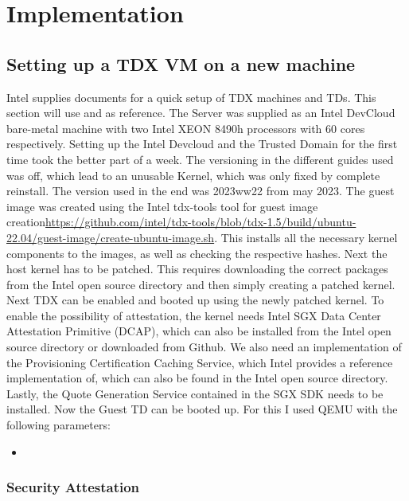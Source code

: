 
\chapter{Implementation}

\section{Setting up a TDX VM on a new machine}
\label{ch:SettingUpTDX}
Intel supplies documents for a quick setup of TDX machines and TDs. This section will use \cite{GettingStartedIntel} and \cite{IntelSubstackForLinux} as reference. The Server was supplied as an Intel DevCloud bare-metal machine with two Intel XEON 8490h processors with 60 cores respectively. Setting up the Intel Devcloud and the Trusted Domain for the first time took the better part of a week. The versioning in the different guides used \cite{gettingStarted} \cite{TDXWhitepaperFebruary2022Pdf} was off, which lead to an unusable Kernel, which was only fixed by complete reinstall. The version used in the end was 2023ww22 from may 2023. The guest image was created using the Intel tdx-tools tool for guest image creation\url{https://github.com/intel/tdx-tools/blob/tdx-1.5/build/ubuntu-22.04/guest-image/create-ubuntu-image.sh}.
This installs all the necessary kernel components to the images, as well as checking the respective hashes. Next the host kernel has to be patched. This requires downloading the correct packages from the Intel open source directory and then simply creating a patched kernel. Next TDX can be enabled and booted up using the newly patched kernel. To enable the possibility of attestation, the kernel needs Intel SGX Data Center Attestation Primitive (DCAP), which can also be installed from the Intel open source directory or downloaded from Github. We also need an implementation of the Provisioning Certification Caching Service, which Intel provides a reference implementation of, which can also be found in the Intel open source directory. Lastly, the Quote Generation Service contained in the SGX SDK needs to be installed. Now the Guest TD can be booted up. For this I used QEMU with the following parameters:

\begin{itemize}
    \item {}
\end{itemize}

\subsection{Security Attestation}

